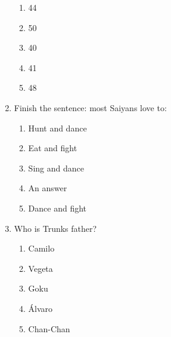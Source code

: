 \documentclass[letterpaper,addpoints,answers,twocolumn,10pt]{exam}
\begin{document}
\begin{enumerate}[leftmargin=.2in]
\begin{enumerate}[noitemsep,leftmargin=0in]
\item  44
\item  50
\item  40
\item  41
\item  48


\end{enumerate}



\item  Finish the sentence: most Saiyans love to:


\begin{enumerate}[noitemsep,leftmargin=0in]


\item  Hunt and dance
\item  Eat and fight
\item  Sing and dance
\item  An answer
\item  Dance and fight


\end{enumerate}



\item  Who is Trunks father?


\begin{enumerate}[noitemsep,leftmargin=0in]


\item  Camilo
\item  Vegeta
\item  Goku
\item  Álvaro
\item  Chan-Chan


\end{enumerate}



\end{enumerate}
\end{document}
